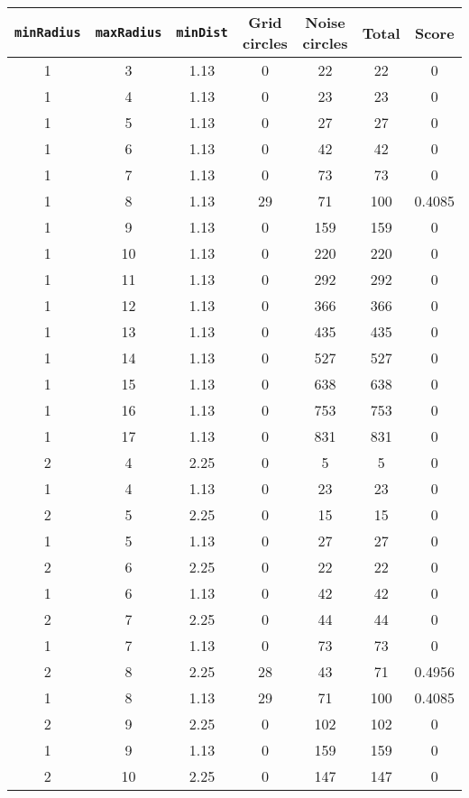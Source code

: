 \documentclass[letterpaper, 12pt]{article}
\begin{document}
\begin{longtable}{|c|c|c|c|c|c|c|}
\hline
\textbf{\texttt{minRadius}} & \textbf{\texttt{maxRadius}} & \textbf{\texttt{minDist}} & \textbf{Grid circles} & \textbf{Noise circles} & \textbf{Total} & \textbf{Score} \\
\hline
1 & 3 & 1.13 & 0 & 22 & 22 & 0 \\
\hline
1 & 4 & 1.13 & 0 & 23 & 23 & 0 \\
\hline
1 & 5 & 1.13 & 0 & 27 & 27 & 0 \\
\hline
1 & 6 & 1.13 & 0 & 42 & 42 & 0 \\
\hline
1 & 7 & 1.13 & 0 & 73 & 73 & 0 \\
\hline
1 & 8 & 1.13 & 29 & 71 & 100 & 0.4085 \\
\hline
1 & 9 & 1.13 & 0 & 159 & 159 & 0 \\
\hline
1 & 10 & 1.13 & 0 & 220 & 220 & 0 \\
\hline
1 & 11 & 1.13 & 0 & 292 & 292 & 0 \\
\hline
1 & 12 & 1.13 & 0 & 366 & 366 & 0 \\
\hline
1 & 13 & 1.13 & 0 & 435 & 435 & 0 \\
\hline
1 & 14 & 1.13 & 0 & 527 & 527 & 0 \\
\hline
1 & 15 & 1.13 & 0 & 638 & 638 & 0 \\
\hline
1 & 16 & 1.13 & 0 & 753 & 753 & 0 \\
\hline
1 & 17 & 1.13 & 0 & 831 & 831 & 0 \\
\hline
2 & 4 & 2.25 & 0 & 5 & 5 & 0 \\
\hline
1 & 4 & 1.13 & 0 & 23 & 23 & 0 \\
\hline
2 & 5 & 2.25 & 0 & 15 & 15 & 0 \\
\hline
1 & 5 & 1.13 & 0 & 27 & 27 & 0 \\
\hline
2 & 6 & 2.25 & 0 & 22 & 22 & 0 \\
\hline
1 & 6 & 1.13 & 0 & 42 & 42 & 0 \\
\hline
2 & 7 & 2.25 & 0 & 44 & 44 & 0 \\
\hline
1 & 7 & 1.13 & 0 & 73 & 73 & 0 \\
\hline
2 & 8 & 2.25 & 28 & 43 & 71 & 0.4956 \\
\hline
1 & 8 & 1.13 & 29 & 71 & 100 & 0.4085 \\
\hline
2 & 9 & 2.25 & 0 & 102 & 102 & 0 \\
\hline
1 & 9 & 1.13 & 0 & 159 & 159 & 0 \\
\hline
2 & 10 & 2.25 & 0 & 147 & 147 & 0 \\

\end{longtable}
\end{document}
